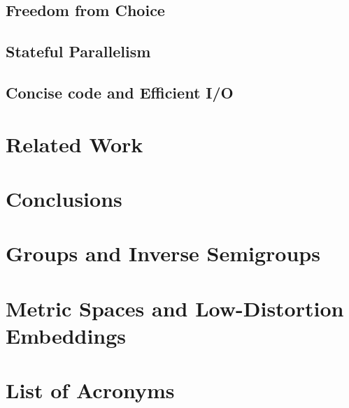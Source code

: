 \documentclass[
		twoside,openright,titlepage,numbers=noenddot,headinclude,%
	 	footinclude=true,cleardoublepage=empty,
		dottedtoc, %
		BCOR=5mm,paper=a4,fontsize=10pt, %
		ngerman,american, %
		]{scrreprt}
\begin{document}
\section{Freedom from Choice}
 
\section{Stateful Parallelism}

\section{Concise code and Efficient \ac{I/O}}


\chapter{Related Work}


\chapter{Conclusions} 


\appendix

\chapter{Groups and Inverse Semigroups}
\label{appendix:groups}

\chapter{Metric Spaces and Low-Distortion Embeddings}
\label{appendix:metric}

%

%
%
\clearpage
\printbibliography[title={References},notkeyword={contribution}]

\listoffigures

\printindex

\chapter*{List of Acronyms}

\clearpage
\end{document}
